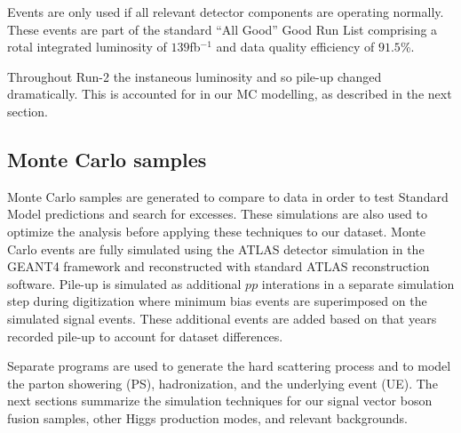 Events are only used if all relevant detector components are operating normally. These events are part of the standard ``All Good'' Good Run List comprising a rotal integrated luminosity of $139$fb$^{-1}$ and data quality efficiency of $91.5$\%.

Throughout Run-2 the instaneous luminosity and so pile-up changed dramatically. This is accounted for in our MC modelling, as described in the next section.

\subsection{Monte Carlo samples}


Monte Carlo samples are generated to compare to data in order to test Standard Model predictions and search for excesses. These simulations are also used to optimize the analysis before applying these techniques to our dataset. Monte Carlo events are fully simulated using the ATLAS detector simulation in the GEANT4 framework \cite{GEANT4} and reconstructed with standard ATLAS reconstruction software. Pile-up is simulated as additional $pp$ interations in a separate simulation step during digitization where minimum bias events are superimposed on the simulated signal events. These additional events are added based on that years recorded pile-up to account for dataset differences. 

Separate programs are used to generate the hard scattering process and to model the parton showering (PS), hadronization, and the underlying event (UE). The next sections summarize the simulation techniques for our signal vector boson fusion samples, other Higgs production modes, and relevant backgrounds.   


